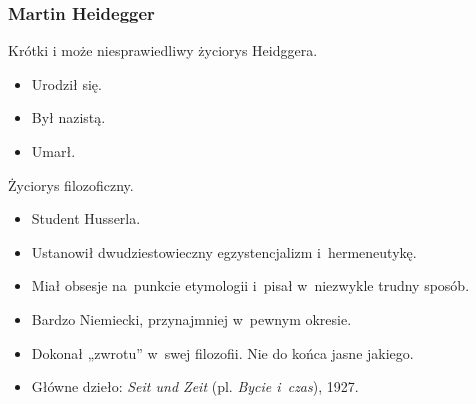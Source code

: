 \documentclass[10pt,t]{beamer}
\begin{document}
\begin{frame}
  \frametitle{Martin Heidegger}

  Krótki i może niesprawiedliwy życiorys Heidggera.
  \begin{itemize}

  \item Urodził się.

  \item Był nazistą.

  \item Umarł.

  \end{itemize}

  Życiorys filozoficzny.
  \begin{itemize}

  \item Student Husserla.

  \item Ustanowił dwudziestowieczny egzystencjalizm
    i~hermeneutykę.

  \item Miał obsesje na~punkcie etymologii i~pisał w~niezwykle trudny
    sposób.

  \item Bardzo Niemiecki, przynajmniej w~pewnym okresie.

  \item Dokonał „zwrotu” w~swej filozofii. Nie do końca jasne jakiego.

  \item Główne dzieło: \textit{Seit und Zeit} (pl. \textit{Bycie i~czas}),
    1927.

  \end{itemize}

\end{frame}

\end{document}
